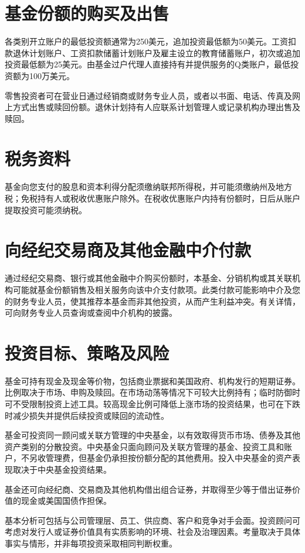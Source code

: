 \documentclass[UTF8,fontset=none,11pt,a4paper]{ctexart}
\begin{document}
\section*{基金份额的购买及出售}
各类别开立账户的最低投资额通常为250美元，追加投资最低额为50美元。工资扣款退休计划账户、工资扣款储蓄计划账户及雇主设立的教育储蓄账户，初次或追加投资最低额为25美元。由基金过户代理人直接持有并提供服务的Q类账户，最低投资额为100万美元。


零售投资者可在营业日通过经销商或财务专业人员，或者以书面、电话、传真及网上方式出售或赎回份额。退休计划持有人应联系计划管理人或记录机构办理出\allowbreak\mbox{售及赎回。}


\section*{税务资料}
基金向您支付的股息和资本利得分配须缴纳联邦所得税，并可能须缴纳州及地方税；免税持有人或税收优惠账户除外。在税收优惠账户内持有份额时，日后从账户提取投资可\allowbreak\mbox{能须纳税。}


\section*{向经纪交易商及其他金融中介付款}
通过经纪交易商、银行或其他金融中介购买份额时，本基金、分销机构或其关联机构可能就基金份额销售及相关服务向该中介支付款项。此类付款可能影响中介及您的财务专业人员，使其推荐本基金而非其他投资，从而产生利益冲突。有关详情，可向财务专业人员查询或查阅中介机\allowbreak\mbox{构的披露。}


\section*{投资目标、策略及风险}
基金可持有现金及现金等价物，包括商业票据和美国政府、机构发行的短期证券。比例取决于市场、申购及赎回。在市场动荡等情况下可较大比例持有；临时防御时可不受限制投资上述工具。较高现金比例可降低上涨市场的投资结果，也可在下跌时减少损失并提供后续投资或赎回\allowbreak\mbox{的流动性。}


基金可投资同一顾问或关联方管理的中央基金，以有效取得货币市场、债券及其他资产类别的分散投资。中央基金只面向顾问及关联方管理的基金、投资工具和账户，不另收管理费，但基金仍承担按份额分配的其他费用。投入中央基金的资产表现取决于中央基金\allowbreak\mbox{投资结果。}


基金还可向经纪商、交易商及其他机构借出组合证券，并取得至少等于借出证券价值的现金或美国国\allowbreak\mbox{债作担保。}


基本分析可包括与公司管理层、员工、供应商、客户和竞争对手会面。投资顾问可考虑对发行人或证券价值具有实质影响的环境、社会及治理因素。考量取决于具体事实与情形，并非每项投资采取相同\allowbreak\mbox{判断权重。}
\end{document}
